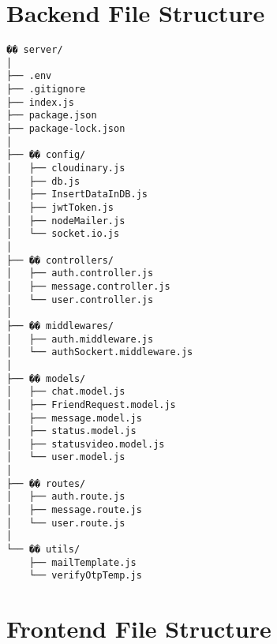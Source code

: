 \documentclass[12pt,a4paper]{report}
\begin{document}
\section{Backend File Structure}

\begin{verbatim}
�� server/
│
├── .env
├── .gitignore
├── index.js
├── package.json
├── package-lock.json
│
├── �� config/
│   ├── cloudinary.js
│   ├── db.js
│   ├── InsertDataInDB.js
│   ├── jwtToken.js
│   ├── nodeMailer.js
│   └── socket.io.js
│
├── �� controllers/
│   ├── auth.controller.js
│   ├── message.controller.js
│   └── user.controller.js
│
├── �� middlewares/
│   ├── auth.middleware.js
│   └── authSockert.middleware.js
│
├── �� models/
│   ├── chat.model.js
│   ├── FriendRequest.model.js
│   ├── message.model.js
│   ├── status.model.js
│   ├── statusvideo.model.js
│   └── user.model.js
│
├── �� routes/
│   ├── auth.route.js
│   ├── message.route.js
│   └── user.route.js
│
└── �� utils/
    ├── mailTemplate.js
    └── verifyOtpTemp.js
\end{verbatim}

\newpage

\section{Frontend File Structure}
\end{document}

